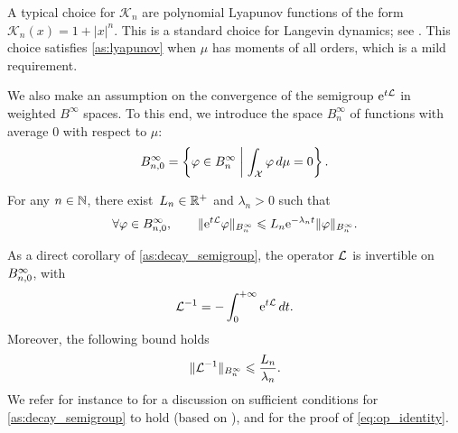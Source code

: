 A typical choice for $\mathcal{K}_n$ are polynomial Lyapunov functions of the form $\mathcal{K}_n(x) = 1+|x|^n$. This is a standard choice for Langevin dynamics; see \cite{mattingly2002,talay2002}. This choice satisfies \cref{as:lyapunov} when $\mu$ has moments of all orders, which is a mild requirement.

We also make an assumption on the convergence of the semigroup $\mathrm{e}^{t\mathcal{L}}$ in weighted $B^\infty$ spaces. To this end, we introduce the space $B^\infty_n$ of functions with average 0 with respect to $\mu$:
%
\begin{equation}
    B_{n,0}^{\infty} = \left\{\varphi \in B^\infty_n \; \middle| \; \int_\mathcal{X} \varphi \, d\mu = 0\right\}.
\end{equation}
%

\begin{assumption}
	\label{as:decay_semigroup}
	For any $n\in\mathbb{N}$, there exist~$L_n \in \mathbb{R}^+$ and $\lambda_n>0$ such that
	\begin{equation}
		\forall \varphi\in B_{n,0}^{\infty}, \qquad \|\mathrm{e}^{t\mathcal{L}}\varphi\|_{B^\infty_n} \leqslant L_n\mathrm{e}^{-\lambda_n t}\lVert\varphi\rVert_{B^\infty_n}.
	\label{eq:decay}
	\end{equation}
\end{assumption}
%

As a direct corollary of \cref{as:decay_semigroup}, the operator $\mathcal{L}$ is invertible on $B_{n,0}^{\infty}$, with
%
\begin{equation}
	\mathcal{L}^{-1} = -\int_0^{+\infty} \mathrm{e}^{t\mathcal{L}} \, dt.
	\label{eq:op_identity}
\end{equation}
%
Moreover, the following bound holds
%
\begin{equation}
	\lVert\mathcal{L}^{-1}\rVert_{B^\infty_n} \leqslant \frac{L_n}{\lambda_n}.
	\label{eq:Linv_bound}
\end{equation}
%
We refer for instance to \cite[Section 2]{acta_numerica2016} for a discussion on sufficient conditions for \cref{as:decay_semigroup} to hold (based on \cite{luc2006,mattingly2011}), and for the proof of \eqref{eq:op_identity}. 

